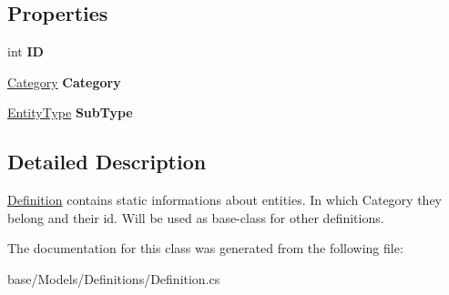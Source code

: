 \subsection*{Properties}
\begin{DoxyCompactItemize}
\item 
\hypertarget{classCore_1_1Models_1_1Definitions_1_1Definition_a6504fe4404e24c0b0601b0591f99fda4}{int {\bfseries I\-D}}\label{classCore_1_1Models_1_1Definitions_1_1Definition_a6504fe4404e24c0b0601b0591f99fda4}

\item 
\hypertarget{classCore_1_1Models_1_1Definitions_1_1Definition_abbcf001ffb2d8453d321e3524739b48e}{\hyperlink{namespaceCore_1_1Models_1_1Definitions_a8be0403c3e883fe583d7bb3893c22c65}{Category} {\bfseries Category}}\label{classCore_1_1Models_1_1Definitions_1_1Definition_abbcf001ffb2d8453d321e3524739b48e}

\item 
\hypertarget{classCore_1_1Models_1_1Definitions_1_1Definition_ae71f596d97485f31733d1b9b5144051a}{\hyperlink{namespaceCore_1_1Models_1_1Definitions_a609ed13db028308ebc6c5fbd98615fdc}{Entity\-Type} {\bfseries Sub\-Type}}\label{classCore_1_1Models_1_1Definitions_1_1Definition_ae71f596d97485f31733d1b9b5144051a}

\end{DoxyCompactItemize}


\subsection{Detailed Description}
\hyperlink{classCore_1_1Models_1_1Definitions_1_1Definition}{Definition} contains static informations about entities. In which Category they belong and their id. Will be used as base-\/class for other definitions. 



The documentation for this class was generated from the following file\-:\begin{DoxyCompactItemize}
\item 
base/\-Models/\-Definitions/Definition.\-cs\end{DoxyCompactItemize}
